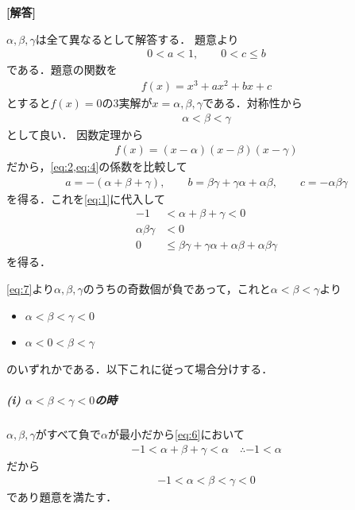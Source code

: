 \documentclass[../../main.tex]{subfiles}
\begin{document}
\begin{oframed}
  
\end{oframed}

{\bf [解答]}

$\alpha,\beta,\gamma$は全て異なるとして解答する．
題意より
\begin{align}
  0<a<1, \qquad 0<c\le b \label{eq:1}
\end{align}
である．題意の関数を
\begin{align}
  f(x)=x^3+ax^2+bx+c \label{eq:2}
\end{align}
とすると$f(x)=0$の3実解が$x=\alpha,\beta,\gamma$である．対称性から
\begin{align}
  \alpha < \beta < \gamma \label{eq:3}
\end{align}
として良い．
因数定理から
\begin{align}
  f(x)=(x-\alpha)(x-\beta)(x-\gamma) \label{eq:4}
\end{align}
だから，\cref{eq:2,eq:4}の係数を比較して
\begin{align}
  a=-(\alpha+\beta+\gamma), \qquad b=\beta\gamma+\gamma\alpha+\alpha\beta, \qquad c=-\alpha\beta\gamma \label{eq:5}
\end{align}
を得る．これを\cref{eq:1}に代入して
\begin{align}
  -1&<\alpha+\beta+\gamma<0  \label{eq:6}\\
  \alpha\beta\gamma&<0       \label{eq:7}\\
  0&\le\beta\gamma+\gamma\alpha+\alpha\beta+\alpha\beta\gamma \label{eq:8}
\end{align}
を得る．

\cref{eq:7}より$\alpha,\beta,\gamma$のうちの奇数個が負であって，これと$\alpha<\beta<\gamma$より
\begin{itemize}
  \item[(i)] $\alpha<\beta<\gamma<0$
  \item[(ii)] $\alpha<0<\beta<\gamma$
\end{itemize}
のいずれかである．以下これに従って場合分けする．

\subparagraph{(i) $\alpha<\beta<\gamma<0$の時}

$\alpha,\beta,\gamma$がすべて負で$\alpha$が最小だから\cref{eq:6}において
\begin{align}
  -1<\alpha+\beta+\gamma < \alpha \quad \therefore -1 < \alpha
\end{align}
だから
\begin{align}
  -1 < \alpha < \beta < \gamma < 0
\end{align}
であり題意を満たす．
\end{document}
